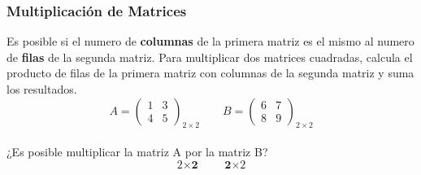 \documentclass[stu, 12pt, a4paper, donotrepeattitle, floatsintext, natbib]{apa7}
\begin{document}
    \subsubsection{Multiplicación de Matrices}
    Es posible si el numero de \textbf{columnas} de la primera matriz es el mismo al numero de \textbf{filas} de la segunda matriz.
    Para multiplicar dos matrices cuadradas, calcula el producto de filas de la primera matriz con columnas de la segunda matriz y suma los resultados.
    \[
        A=\begin{pmatrix}
              1 & 3 \\ 4 & 5
        \end{pmatrix}_{2\times2}
        \qquad
        B=\begin{pmatrix}
              6 & 7 \\ 8 & 9
        \end{pmatrix}_{2\times2}
    \]\\

    ¿Es posible multiplicar la matriz A por la matriz B?
    \[{\textit{2}\times\textbf{2}} \qquad {\textbf{2}\times\textit{2}}\]\\
\end{document}
